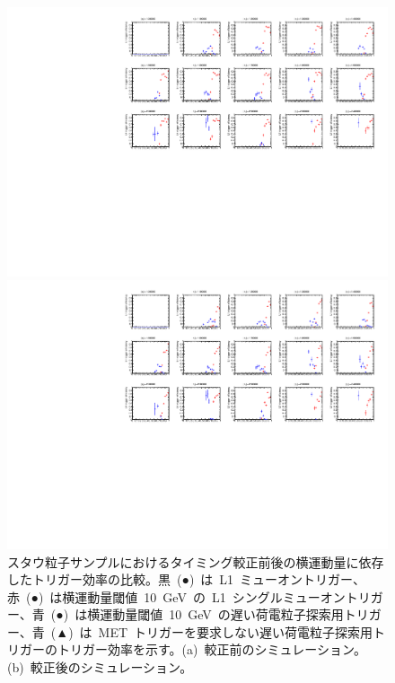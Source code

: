 \begin{figure}[tbp]
    \begin{minipage}{0.49\hsize}
    \centering   
    \includegraphics[width=\textwidth,page=4]{img/rec/stau_600_ori.pdf}
    \subcaption{}
    \end{minipage}
    \begin{minipage}{0.49\hsize}
    \centering   
    \includegraphics[width=\textwidth,page=4]{img/rec/stau_600.pdf}
    \subcaption{}
    \end{minipage}
    \caption[スタウ粒子サンプルにおけるタイミング較正前後の横運動量に依存したトリガー効率の比較]{スタウ粒子サンプルにおけるタイミング較正前後の横運動量に依存したトリガー効率の比較。黒~(●)~は~L1~ミューオントリガー、赤~(●)~は横運動量閾値~10~GeV~の~L1~シングルミューオントリガー、青~(●)~は横運動量閾値~10~GeV~の遅い荷電粒子探索用トリガー、青~(▲)~は~MET~トリガーを要求しない遅い荷電粒子探索用トリガーのトリガー効率を示す。(a)~較正前のシミュレーション。(b)~較正後のシミュレーション。}\label{fig:tript}
\end{figure}
